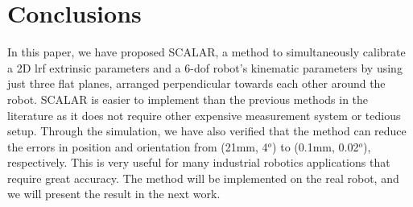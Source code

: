 \section{Conclusions}
\label{sec:conclusions}

In this paper, we have proposed SCALAR, a method to simultaneously calibrate a 2D \ac{lrf} extrinsic parameters and a 6-\ac{dof} robot's kinematic parameters by using just three flat planes, arranged perpendicular towards each other around the robot. SCALAR is easier to implement than the previous methods in the literature as it does not require other expensive measurement system or tedious setup. Through the simulation, we have also verified that the method can reduce the errors in position and orientation from (21mm, 4$^o$) to (0.1mm, 0.02$^o$), respectively. This is very useful for many industrial robotics applications that require great accuracy. The method will be implemented on the real robot, and we will present the result in the next work. 
